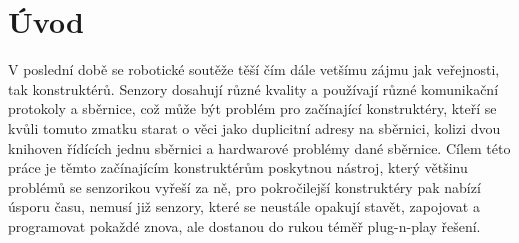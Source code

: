 \chapter*{Úvod}
V poslední době se robotické soutěže těší čím dále vetšímu zájmu jak veřejnosti, tak konstruktérů. Senzory dosahují různé kvality a používají různé komunikační protokoly a sběrnice, což může být problém pro začínající konstruktéry, kteří se kvůli tomuto zmatku starat o věci jako duplicitní adresy na sběrnici, kolizi dvou knihoven řídících jednu sběrnici a hardwarové problémy dané sběrnice. Cílem této práce je těmto začínajícím konstruktérům poskytnou nástroj, který většinu problémů se senzorikou vyřeší za ně, pro pokročilejší konstruktéry pak nabízí úsporu času, nemusí již senzory, které se neustále opakují stavět, zapojovat a programovat pokaždé znova, ale dostanou do rukou téměř plug-n-play řešení.

\newpage